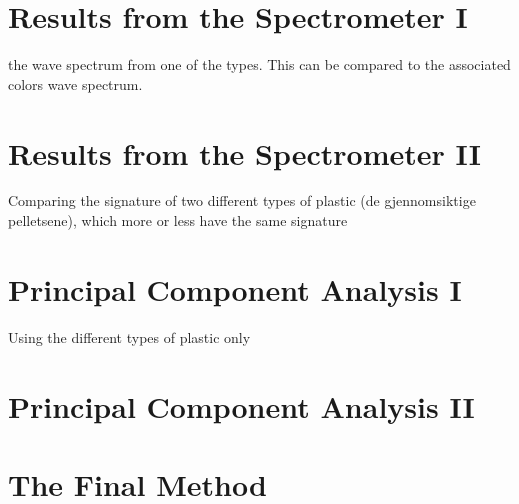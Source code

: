 \section{Results from the Spectrometer I} 
the wave spectrum from one of the types. This can be compared to the associated colors wave spectrum. 
\section{Results from the Spectrometer II}
Comparing the signature of two different types of plastic (de gjennomsiktige pelletsene), which more or less have the same signature
\section{Principal Component Analysis I}
Using the different types of plastic only

\section{Principal Component Analysis II} 


\section{The Final Method} 